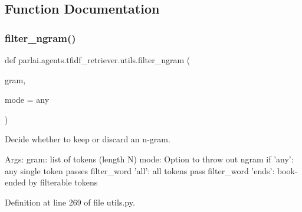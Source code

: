 \subsection{Function Documentation}
\mbox{\label{namespaceparlai_1_1agents_1_1tfidf__retriever_1_1utils_a791c829884544e127e480a52d233d521}} 
\subsubsection{\texorpdfstring{filter\+\_\+ngram()}{filter\_ngram()}}
{\footnotesize\ttfamily def parlai.\+agents.\+tfidf\+\_\+retriever.\+utils.\+filter\+\_\+ngram (\begin{DoxyParamCaption}\item[{}]{gram,  }\item[{}]{mode = {\ttfamily \textquotesingle{}any\textquotesingle{}} }\end{DoxyParamCaption})}

\begin{DoxyVerb}Decide whether to keep or discard an n-gram.

Args:
    gram: list of tokens (length N)
    mode: Option to throw out ngram if
      'any': any single token passes filter_word
      'all': all tokens pass filter_word
      'ends': book-ended by filterable tokens
\end{DoxyVerb}
 

Definition at line 269 of file utils.\+py.


